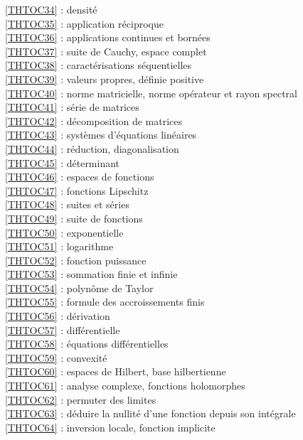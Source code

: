\ref {THTOC34} : densité\\
\ref {THTOC35} : application réciproque\\
\ref {THTOC36} : applications continues et bornées\\
\ref {THTOC37} : suite de Cauchy, espace complet\\
\ref {THTOC38} : caractérisations séquentielles\\
\ref {THTOC39} : valeurs propres, définie positive\\
\ref {THTOC40} : norme matricielle, norme opérateur et rayon spectral\\
\ref {THTOC41} : série de matrices\\
\ref {THTOC42} : décomposition de matrices\\
\ref {THTOC43} : systèmes d'équations linéaires\\
\ref {THTOC44} : réduction, diagonalisation\\
\ref {THTOC45} : déterminant\\
\ref {THTOC46} : espaces de fonctions\\
\ref {THTOC47} : fonctions Lipschitz\\
\ref {THTOC48} : suites et séries\\
\ref {THTOC49} : suite de fonctions\\
\ref {THTOC50} : exponentielle\\
\ref {THTOC51} : logarithme\\
\ref {THTOC52} : fonction puissance\\
\ref {THTOC53} : sommation finie et infinie\\
\ref {THTOC54} : polynôme de Taylor\\
\ref {THTOC55} : formule des accroissements finis\\
\ref {THTOC56} : dérivation\\
\ref {THTOC57} : différentielle\\
\ref {THTOC58} : équations différentielles\\
\ref {THTOC59} : convexité\\
\ref {THTOC60} : espaces de Hilbert, base hilbertienne\\
\ref {THTOC61} : analyse complexe, fonctions holomorphes\\
\ref {THTOC62} : permuter des limites\\
\ref {THTOC63} : déduire la nullité d'une fonction depuis son intégrale\\
\ref {THTOC64} : inversion locale, fonction implicite\\
